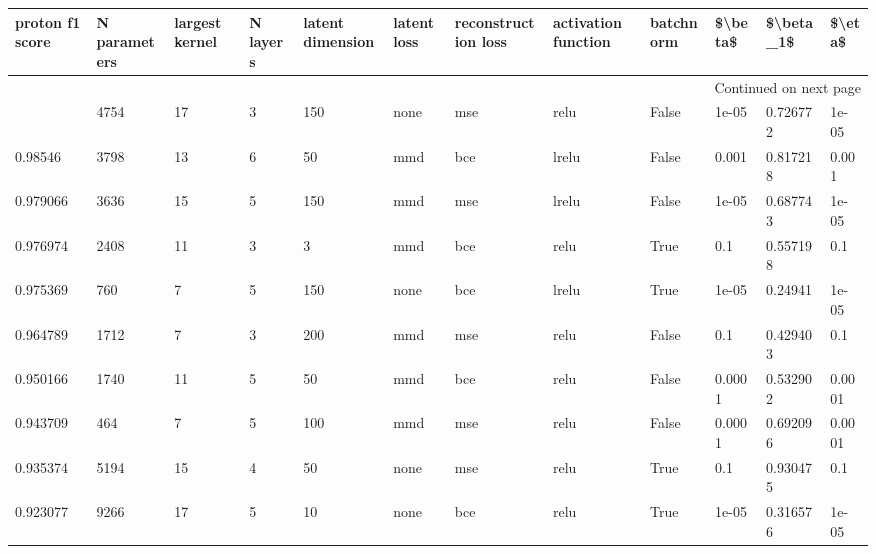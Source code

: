 \begin{longtable}{llllllllllll}
\toprule
proton f1 score & N parameters & largest kernel & N layers & latent dimension & latent loss & reconstruction loss & activation function & batchnorm & \$\textbackslash beta\$ & \$\textbackslash beta\_1\$ &  \$\textbackslash eta\$ \\
\midrule
\endhead
\midrule
\multicolumn{12}{r}{{Continued on next page}} \\
\midrule
\endfoot

\bottomrule
\endlastfoot
       0.986667 &         4754 &             17 &        3 &              150 &        none &                 mse &                relu &     False &   1e-05 &  0.726772 &   1e-05 \\
        0.98546 &         3798 &             13 &        6 &               50 &         mmd &                 bce &               lrelu &     False &   0.001 &  0.817218 &   0.001 \\
       0.979066 &         3636 &             15 &        5 &              150 &         mmd &                 mse &               lrelu &     False &   1e-05 &  0.687743 &   1e-05 \\
       0.976974 &         2408 &             11 &        3 &                3 &         mmd &                 bce &                relu &      True &     0.1 &  0.557198 &     0.1 \\
       0.975369 &          760 &              7 &        5 &              150 &        none &                 bce &               lrelu &      True &   1e-05 &   0.24941 &   1e-05 \\
       0.964789 &         1712 &              7 &        3 &              200 &         mmd &                 mse &                relu &     False &     0.1 &  0.429403 &     0.1 \\
       0.950166 &         1740 &             11 &        5 &               50 &         mmd &                 bce &                relu &     False &  0.0001 &  0.532902 &  0.0001 \\
       0.943709 &          464 &              7 &        5 &              100 &         mmd &                 mse &                relu &     False &  0.0001 &  0.692096 &  0.0001 \\
       0.935374 &         5194 &             15 &        4 &               50 &        none &                 mse &                relu &      True &     0.1 &  0.930475 &     0.1 \\
       0.923077 &         9266 &             17 &        5 &               10 &        none &                 bce &                relu &      True &   1e-05 &  0.316576 &   1e-05 \\

\end{longtable}
